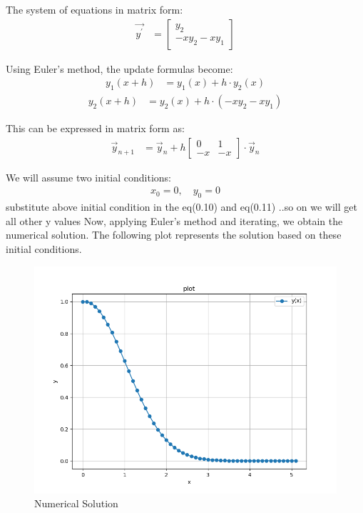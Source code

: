 \documentclass[journal]{IEEEtran}
\begin{document}
The system of equations in matrix form:
\begin{align}
\vec{y^\prime} &= \begin{bmatrix} 
y_2 \\ 
-xy_2 - xy_1 
\end{bmatrix}
\end{align}

Using Euler's method, the update formulas become:
\begin{align}
y_1(x+h) &= y_1(x) + h \cdot y_2(x)
\end{align}
\begin{align}
y_2(x+h) &= y_2(x) + h \cdot \left( -xy_2 -x y_1 \right)
\end{align}

This can be expressed in matrix form as:
\begin{align}
    \vec{y}_{n+1} &= \vec{y}_n + h \begin{bmatrix}
    0 & 1 \\ 
    -x & -x 
    \end{bmatrix} \cdot \vec{y}_n
\end{align}

We will assume two initial conditions:
\begin{align}
x_0 = 0,\quad y_0 = 0
\end{align}
substitute above initial condition in the eq(0.10) and eq(0.11) ..so on we will get all other y values 
Now, applying Euler's method and iterating, we obtain the numerical solution. The following plot represents the solution based on these initial conditions.

 \begin{figure}[h!]
    \centering
    \includegraphics[width=1\columnwidth]{figure/fig.png} 
    \caption{Numerical Solution}
    \label{stemplot}
\end{figure}
\end{document}
